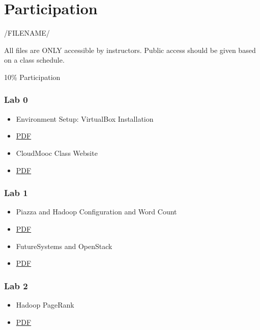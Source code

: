 \chapter{Participation}\label{participation}

/FILENAME/

All files are ONLY accessible by instructors. Public access
  should be given based on a class schedule.

10\% Participation

\subsection{Lab 0}\label{lab-0}

\begin{itemize}
\item
  Environment Setup: VirtualBox Installation
\item
  \href{https://drive.google.com/open?id=0B88HKpainTSfRFgwX0IxaWM5TFE}{PDF}
\item
  CloudMooc Class Website
\item
  \href{https://drive.google.com/open?id=0B88HKpainTSfS3hNb2tVSW9GcE0}{PDF}
\end{itemize}

\subsection{Lab 1}\label{lab-1}

\begin{itemize}
\item
  Piazza and Hadoop Configuration and Word Count
\item
  \href{https://drive.google.com/open?id=0B88HKpainTSfMzVSa1pYM0tfMzg}{PDF}
\item
  FutureSystems and OpenStack
\item
  \href{https://drive.google.com/open?id=0B88HKpainTSfNEhmeHBveXRSSUk}{PDF}
\end{itemize}

\subsection{Lab 2}\label{lab-2}

\begin{itemize}
\item
  Hadoop PageRank
\item
  \href{https://drive.google.com/open?id=0B88HKpainTSfTWhTaEs0R05RRkE}{PDF}
\end{itemize}

